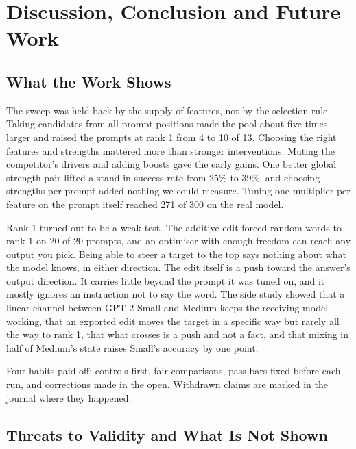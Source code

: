 \chapter{Discussion, Conclusion and Future Work}\label{ch:conclusion}

\section{What the Work Shows}

The sweep was held back by the supply of features, not by the selection rule. Taking candidates from all prompt positions made the pool about five times larger and raised the prompts at rank 1 from 4 to 10 of 13. Choosing the right features and strengths mattered more than stronger interventions. Muting the competitor's drivers and adding boosts gave the early gains. One better global strength pair lifted a stand-in success rate from 25\% to 39\%, and choosing strengths per prompt added nothing we could measure. Tuning one multiplier per feature on the prompt itself reached 271 of 300 on the real model.

Rank 1 turned out to be a weak test. The additive edit forced random words to rank 1 on 20 of 20 prompts, and an optimiser with enough freedom can reach any output you pick. Being able to steer a target to the top says nothing about what the model knows, in either direction. The edit itself is a push toward the answer's output direction. It carries little beyond the prompt it was tuned on, and it mostly ignores an instruction not to say the word. The side study showed that a linear channel between GPT-2 Small and Medium keeps the receiving model working, that an exported edit moves the target in a specific way but rarely all the way to rank 1, that what crosses is a push and not a fact, and that mixing in half of Medium's state raises Small's accuracy by one point.

Four habits paid off: controls first, fair comparisons, pass bars fixed before each run, and corrections made in the open. Withdrawn claims are marked in the journal where they happened.

\section{Threats to Validity and What Is Not Shown}


